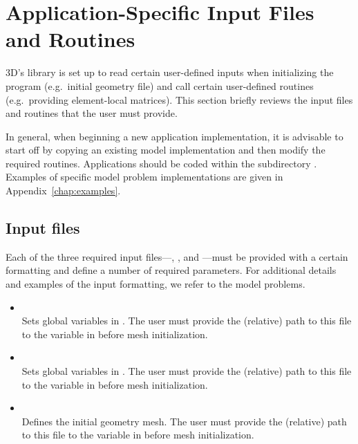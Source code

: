 \section{Application-Specific Input Files and Routines}
\label{sec:simple-example}

\hp3D's library is set up to read certain user-defined inputs when initializing the program (e.g.~initial geometry file) and call certain user-defined routines (e.g.~providing element-local matrices). This section briefly reviews the input files and routines that the user must provide.

In general, when beginning a new application implementation, it is advisable to start off by copying an existing model implementation and then modify the required routines. Applications should be coded within the subdirectory . Examples of specific model problem implementations are given in Appendix~\ref{chap:examples}.

\subsection{Input files}

Each of the three required input files---, , and ---must be provided with a certain formatting and define a number of required parameters. For additional details and examples of the input formatting, we refer to the model problems.

\begin{itemize}
	\item{ 
		\\
		Sets global variables in  . The user must provide the (relative) path to this file to the  variable in   before mesh initialization.
	}\item{
		\\
		Sets global variables in  . The user must provide the (relative) path to this file to the  variable in   before mesh initialization.
	}\item{
		\\
		Defines the initial geometry mesh. The user must provide the (relative) path to this file to the  variable in   before mesh initialization.
	}
\end{itemize}

